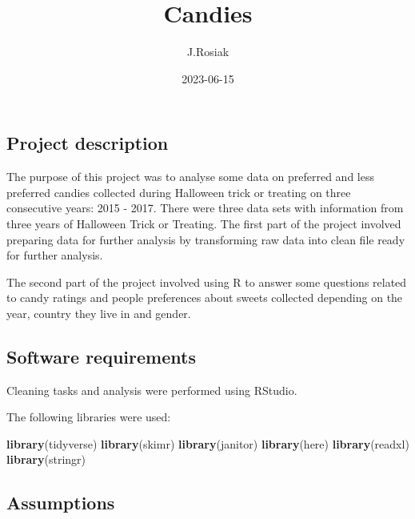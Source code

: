 \documentclass[
]{article}
\title{Candies}
\author{J.Rosiak}
\date{2023-06-15}
\newenvironment{Shaded}{\begin{snugshade}}{\end{snugshade}}
\newcommand{\FunctionTok}[1]{\textcolor[rgb]{0.13,0.29,0.53}{\textbf{#1}}}
\newcommand{\NormalTok}[1]{#1}
\begin{document}
\maketitle

\hypertarget{project-description}{%
\subsection{\texorpdfstring{\textbf{Project
description}}{Project description}}\label{project-description}}

The purpose of this project was to analyse some data on preferred and
less preferred candies collected during Halloween trick or treating on
three consecutive years: 2015 - 2017. There were three data sets with
information from three years of Halloween Trick or Treating. The first
part of the project involved preparing data for further analysis by
transforming raw data into clean file ready for further analysis.

The second part of the project involved using R to answer some questions
related to candy ratings and people preferences about sweets collected
depending on the year, country they live in and gender.

\hypertarget{software-requirements}{%
\subsection{\texorpdfstring{\textbf{Software
requirements}}{Software requirements}}\label{software-requirements}}

Cleaning tasks and analysis were performed using RStudio.

The following libraries were used:

\begin{Shaded}
\begin{Highlighting}[]
\FunctionTok{library}\NormalTok{(tidyverse)}
\FunctionTok{library}\NormalTok{(skimr)}
\FunctionTok{library}\NormalTok{(janitor)}
\FunctionTok{library}\NormalTok{(here)}
\FunctionTok{library}\NormalTok{(readxl)}
\FunctionTok{library}\NormalTok{(stringr)}
\end{Highlighting}
\end{Shaded}

\hypertarget{assumptions}{%
\subsection{\texorpdfstring{\textbf{Assumptions}}{Assumptions}}\label{assumptions}}
\end{document}
